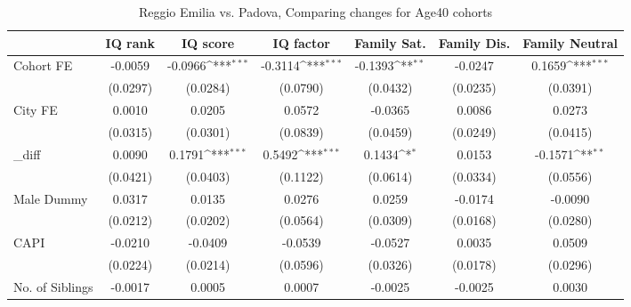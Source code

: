 \begin{table}[htbp]\centering
\def\sym#1{\ifmmode^{#1}\else\(^{#1}\)\fi}
\caption{Reggio Emilia vs. Padova, Comparing changes for Age40 cohorts}
\begin{tabular}{l*{6}{c}}
\toprule
            &\multicolumn{1}{c}{IQ rank}&\multicolumn{1}{c}{IQ score}&\multicolumn{1}{c}{IQ factor}&\multicolumn{1}{c}{Family Sat.}&\multicolumn{1}{c}{Family Dis.}&\multicolumn{1}{c}{Family Neutral}\\
\midrule
Cohort FE   &     -0.0059         &     -0.0966\sym{***}&     -0.3114\sym{***}&     -0.1393\sym{**} &     -0.0247         &      0.1659\sym{***}\\
            &    (0.0297)         &    (0.0284)         &    (0.0790)         &    (0.0432)         &    (0.0235)         &    (0.0391)         \\
\addlinespace
City FE     &      0.0010         &      0.0205         &      0.0572         &     -0.0365         &      0.0086         &      0.0273         \\
            &    (0.0315)         &    (0.0301)         &    (0.0839)         &    (0.0459)         &    (0.0249)         &    (0.0415)         \\
\addlinespace
\_diff       &      0.0090         &      0.1791\sym{***}&      0.5492\sym{***}&      0.1434\sym{*}  &      0.0153         &     -0.1571\sym{**} \\
            &    (0.0421)         &    (0.0403)         &    (0.1122)         &    (0.0614)         &    (0.0334)         &    (0.0556)         \\
\addlinespace
Male Dummy  &      0.0317         &      0.0135         &      0.0276         &      0.0259         &     -0.0174         &     -0.0090         \\
            &    (0.0212)         &    (0.0202)         &    (0.0564)         &    (0.0309)         &    (0.0168)         &    (0.0280)         \\
\addlinespace
CAPI        &     -0.0210         &     -0.0409         &     -0.0539         &     -0.0527         &      0.0035         &      0.0509         \\
            &    (0.0224)         &    (0.0214)         &    (0.0596)         &    (0.0326)         &    (0.0178)         &    (0.0296)         \\
\addlinespace
No. of Siblings&     -0.0017         &      0.0005         &      0.0007         &     -0.0025         &     -0.0025         &      0.0030         \\

\end{tabular}
\end{table}
